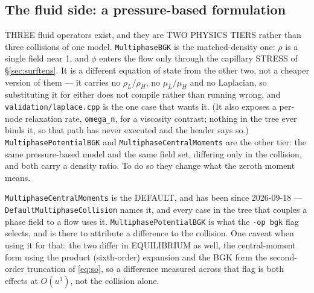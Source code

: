 \documentclass[11pt,a4paper]{article}
\newcommand{\code}[1]{\texttt{\small #1}}
\begin{document}
\subsection{The fluid side: a pressure-based formulation}
\label{sec:pressureform}

THREE fluid operators exist, and they are TWO PHYSICS TIERS rather than three
collisions of one model. \code{MultiphaseBGK} is the matched-density one: $\rho$
is a single field near 1, and $\phi$ enters the flow only through the capillary
STRESS of \S\ref{sec:surftens}. It is a different equation of state from the other
two, not a cheaper version of them --- it carries no $\rho_L/\rho_H$, no
$\mu_L/\mu_H$ and no Laplacian, so substituting it for either does not compile
rather than running wrong, and \code{validation/laplace.cpp} is the one case that
wants it. (It also exposes a per-node relaxation rate, \code{omega\_n}, for a
viscosity contrast; nothing in the tree ever binds it, so that path has never
executed and the header says so.) \code{MultiphasePotentialBGK} and
\code{MultiphaseCentralMoments} are the other tier: the same pressure-based model
and the same field set, differing only in the collision, and both carry a density
ratio. To do so they change what the zeroth moment means.

\code{MultiphaseCentralMoments} is the DEFAULT, and has been since 2026-09-18 ---
\code{DefaultMultiphaseCollision} names it, and every case in the tree that
couples a phase field to a flow uses it. \code{MultiphasePotentialBGK} is what the
\code{-op bgk} flag selects, and is there to attribute a difference to the
collision. One caveat when using it for that: the two differ in EQUILIBRIUM as
well, the central-moment form using the product (sixth-order) expansion and the
BGK form the second-order truncation of \eqref{eq:so}, so a difference measured
across that flag is both effects at $O(u^3)$, not the collision alone.
\end{document}

